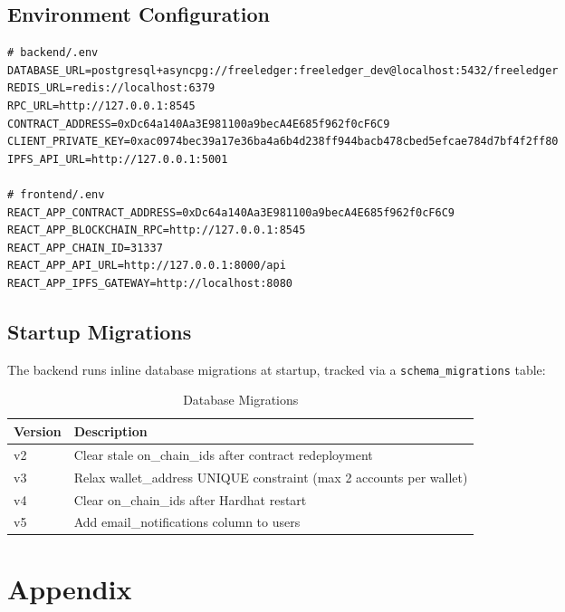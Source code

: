 \documentclass[12pt,a4paper]{article}
\begin{document}
\subsection{Environment Configuration}

\begin{lstlisting}[basicstyle=\ttfamily\scriptsize]
# backend/.env
DATABASE_URL=postgresql+asyncpg://freeledger:freeledger_dev@localhost:5432/freeledger
REDIS_URL=redis://localhost:6379
RPC_URL=http://127.0.0.1:8545
CONTRACT_ADDRESS=0xDc64a140Aa3E981100a9becA4E685f962f0cF6C9
CLIENT_PRIVATE_KEY=0xac0974bec39a17e36ba4a6b4d238ff944bacb478cbed5efcae784d7bf4f2ff80
IPFS_API_URL=http://127.0.0.1:5001

# frontend/.env
REACT_APP_CONTRACT_ADDRESS=0xDc64a140Aa3E981100a9becA4E685f962f0cF6C9
REACT_APP_BLOCKCHAIN_RPC=http://127.0.0.1:8545
REACT_APP_CHAIN_ID=31337
REACT_APP_API_URL=http://127.0.0.1:8000/api
REACT_APP_IPFS_GATEWAY=http://localhost:8080
\end{lstlisting}

\subsection{Startup Migrations}
The backend runs inline database migrations at startup, tracked via a \texttt{schema\_migrations} table:

\begin{table}[h]
\centering
\begin{tabular}{ll}
\toprule
\textbf{Version} & \textbf{Description} \\
\midrule
v2 & Clear stale on\_chain\_ids after contract redeployment \\
v3 & Relax wallet\_address UNIQUE constraint (max 2 accounts per wallet) \\
v4 & Clear on\_chain\_ids after Hardhat restart \\
v5 & Add email\_notifications column to users \\
\bottomrule
\end{tabular}
\caption{Database Migrations}
\end{table}

\section*{Appendix}
\end{document}

